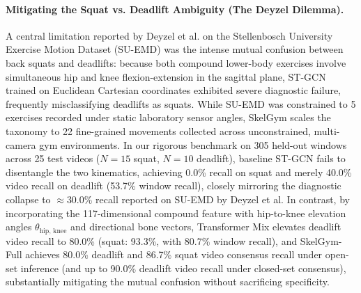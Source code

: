 \documentclass[preprint,12pt]{elsarticle}
\begin{document}
\paragraph{Mitigating the Squat vs. Deadlift Ambiguity (The Deyzel Dilemma).}
A central limitation reported by Deyzel et al. \cite{deyzel2023} on the Stellenbosch University Exercise Motion Dataset (SU-EMD) was the intense mutual confusion between back squats and deadlifts: because both compound lower-body exercises involve simultaneous hip and knee flexion-extension in the sagittal plane, ST-GCN trained on Euclidean Cartesian coordinates exhibited severe diagnostic failure, frequently misclassifying deadlifts as squats. While SU-EMD was constrained to 5 exercises recorded under static laboratory sensor angles, SkelGym scales the taxonomy to 22 fine-grained movements collected across unconstrained, multi-camera gym environments. In our rigorous benchmark on 305 held-out windows across 25 test videos ($N=15$ squat, $N=10$ deadlift), baseline ST-GCN fails to disentangle the two kinematics, achieving 0.0\% recall on squat and merely 40.0\% video recall on deadlift (53.7\% window recall), closely mirroring the diagnostic collapse to $\approx 30.0\%$ recall reported on SU-EMD by Deyzel et al. In contrast, by incorporating the 117-dimensional compound feature with hip-to-knee elevation angles $\theta_{\text{hip, knee}}$ and directional bone vectors, Transformer Mix elevates deadlift video recall to 80.0\% (squat: 93.3\%, with 80.7\% window recall), and SkelGym-Full achieves 80.0\% deadlift and 86.7\% squat video consensus recall under open-set inference (and up to 90.0\% deadlift video recall under closed-set consensus), substantially mitigating the mutual confusion without sacrificing specificity.
\end{document}
